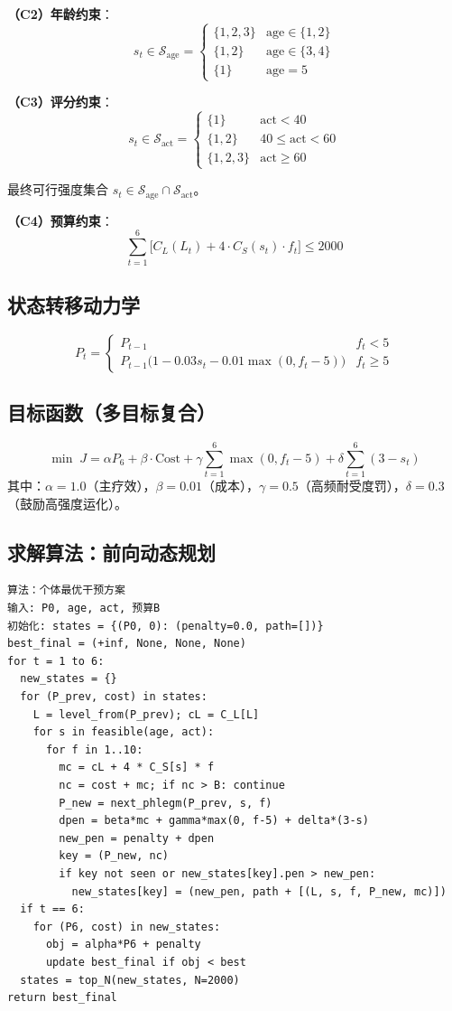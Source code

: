\documentclass{MathorCupmodeling}
\begin{document}
\textbf{（C2）年龄约束}：
\[
s_t \in \mathcal{S}_{\text{age}} = \begin{cases} \{1,2,3\} & \text{age} \in \{1, 2\} \\ \{1, 2\} & \text{age} \in \{3, 4\} \\ \{1\} & \text{age} = 5 \end{cases}
\]

\textbf{（C3）评分约束}：
\[
s_t \in \mathcal{S}_{\text{act}} = \begin{cases} \{1\} & \text{act} < 40 \\ \{1, 2\} & 40 \le \text{act} < 60 \\ \{1, 2, 3\} & \text{act} \ge 60 \end{cases}
\]

最终可行强度集合 $s_t \in \mathcal{S}_{\text{age}} \cap \mathcal{S}_{\text{act}}$。

\textbf{（C4）预算约束}：
\[
\sum_{t=1}^{6} \bigl[ C_L(L_t) + 4 \cdot C_S(s_t) \cdot f_t \bigr] \le 2000
\]

\subsection{状态转移动力学}

\[
P_t = \begin{cases} P_{t-1} & f_t < 5 \\ P_{t-1} \bigl( 1 - 0.03 s_t - 0.01 \max(0, f_t - 5) \bigr) & f_t \ge 5 \end{cases}
\]

\subsection{目标函数（多目标复合）}

\[
\min \; J = \alpha P_6 + \beta \cdot \text{Cost} + \gamma \sum_{t=1}^{6} \max(0, f_t - 5) + \delta \sum_{t=1}^{6} (3 - s_t)
\]
其中：$\alpha = 1.0$（主疗效），$\beta = 0.01$（成本），$\gamma = 0.5$（高频耐受度罚），$\delta = 0.3$（鼓励高强度运化）。

\subsection{求解算法：前向动态规划}

\begin{lstlisting}[basicstyle=\small\ttfamily,mathescape=true]
算法：个体最优干预方案
输入: P0, age, act, 预算B
初始化: states = {(P0, 0): (penalty=0.0, path=[])}
best_final = (+inf, None, None, None)
for t = 1 to 6:
  new_states = {}
  for (P_prev, cost) in states:
    L = level_from(P_prev); cL = C_L[L]
    for s in feasible(age, act):
      for f in 1..10:
        mc = cL + 4 * C_S[s] * f
        nc = cost + mc; if nc > B: continue
        P_new = next_phlegm(P_prev, s, f)
        dpen = beta*mc + gamma*max(0, f-5) + delta*(3-s)
        new_pen = penalty + dpen
        key = (P_new, nc)
        if key not seen or new_states[key].pen > new_pen:
          new_states[key] = (new_pen, path + [(L, s, f, P_new, mc)])
  if t == 6:
    for (P6, cost) in new_states:
      obj = alpha*P6 + penalty
      update best_final if obj < best
  states = top_N(new_states, N=2000)
return best_final
\end{lstlisting}
\end{document}
